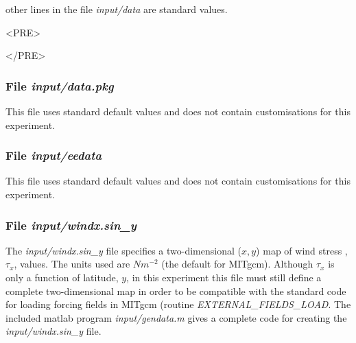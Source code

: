 \begin{itemize}

\end{itemize}

\noindent other lines in the file {\it input/data} are standard values.

\begin{rawhtml}<PRE>\end{rawhtml}
\begin{small}

\end{small}
\begin{rawhtml}</PRE>\end{rawhtml}

\subsubsection{File {\it input/data.pkg}}
\label{www:tutorials}

This file uses standard default values and does not contain
customisations for this experiment.

\subsubsection{File {\it input/eedata}}
\label{www:tutorials}

This file uses standard default values and does not contain
customisations for this experiment.

\subsubsection{File {\it input/windx.sin\_y}}
\label{www:tutorials}

The {\it input/windx.sin\_y} file specifies a two-dimensional ($x,y$)
map of wind stress ,$\tau_{x}$, values. The units used are $Nm^{-2}$
(the default for MITgcm).  Although $\tau_{x}$ is only a function of
latitude, $y$, in this experiment this file must still define a
complete two-dimensional map in order to be compatible with the
standard code for loading forcing fields in MITgcm (routine {\it
  EXTERNAL\_FIELDS\_LOAD}.  The included matlab program {\it
  input/gendata.m} gives a complete code for creating the {\it
  input/windx.sin\_y} file.

